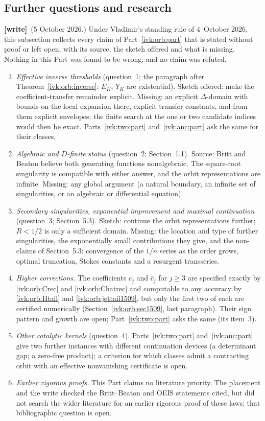 \documentclass[11pt,letterpaper]{article}
\theoremstyle{remark}\newtheorem{remark}[theorem]{Remark}
\newcommand{\wtag}{\textup{\textbf{[write]}}}
\begin{document}
\subsection{Further questions and research}\label{ivk:orb:sub:further}
\wtag\ (5 October 2026.) Under Vladimir's standing rule of 4~October 2026, this subsection collects every claim of Part~\ref{ivk:orb:part} that is stated without proof or left open, with its source, the sketch offered and what is missing. Nothing in this Part was found to be wrong, and no claim was refuted.
\begin{enumerate}[label=\arabic*.]
\item \emph{Effective inverse thresholds} (question~1; the paragraph after Theorem~\ref{ivk:orb:inverse}: $E_K$, $Y_K$ are existential). Sketch offered: make the coefficient-transfer remainder explicit. Missing: an explicit $\Delta$-domain with bounds on the local expansion there, explicit transfer constants, and from them explicit envelopes; the finite search at the one or two candidate indices would then be exact. Parts~\ref{ivk:two:part} and~\ref{ivk:anc:part} ask the same for their classes.
\item \emph{Algebraic and $D$-finite status} (question~2; Section~1.1). Source: Britt and Beaton believe both generating functions nonalgebraic. The square-root singularity is compatible with either answer, and the orbit representations are infinite. Missing: any global argument (a natural boundary, an infinite set of singularities, or an algebraic or differential equation).
\item \emph{Secondary singularities, exponential improvement and maximal continuation} (question~3; Section~5.3). Sketch: continue the orbit representations further; $R<1/2$ is only a sufficient domain. Missing: the location and type of further singularities, the exponentially small contributions they give, and the non-claims of Section~5.3: convergence of the $1/n$ series as the order grows, optimal truncation, Stokes constants and a resurgent transseries.
\item \emph{Higher corrections.} The coefficients $c_j$ and $\widehat c_j$ for $j\ge3$ are specified exactly by \eqref{ivk:orb:Crec} and \eqref{ivk:orb:Chatrec} and computable to any accuracy by \eqref{ivk:orb:Htail} and \eqref{ivk:orb:jettail1509}, but only the first two of each are certified numerically (Section~\ref{ivk:orb:sec1509}, last paragraph). Their sign pattern and growth are open; Part~\ref{ivk:two:part} asks the same (its item~3).
\item \emph{Other catalytic kernels} (question~4). Parts~\ref{ivk:two:part} and~\ref{ivk:anc:part} give two further instances with different continuation devices (a determinant gap; a zero-free product); a criterion for which classes admit a contracting orbit with an effective nonvanishing certificate is open.
\item \emph{Earlier rigorous proofs.} This Part claims no literature priority. The placement and the write checked the Britt--Beaton and OEIS statements cited, but did not search the wider literature for an earlier rigorous proof of these laws; that bibliographic question is open.
\end{enumerate}
\end{document}
